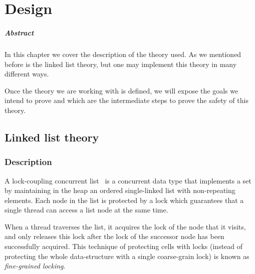 \chapter{Design\label{chap:design}}

\paragraph{Abstract} In this chapter we cover the description of the theory used. As we mentioned before is the linked list theory, but one may implement this theory in many different ways. 

Once the theory we are working with is defined, we will expose the goals we intend to prove and which are the intermediate steps to prove the safety of this theory.

\section{Linked list theory}



\subsection{Description}


\begin{defn}
A lock-coupling concurrent list~\cite{herlihy08art,vafeiadis06proving} is 
a concurrent data type that implements a set by maintaining in the heap an 
ordered single-linked list with non-repeating elements.
%
Each node in the list is protected by a lock which guarantees that a 
single thread can access a list node at the same time.
%
\end{defn}

When a thread traverses the list, it acquires the lock of the node
that it visits, and only releases this lock after the lock of the
successor node has been successfully acquired.
%
This technique of protecting cells with locks (instead of protecting
the whole data-structure with a single coarse-grain lock) is known as
\emph{fine-grained locking}.

